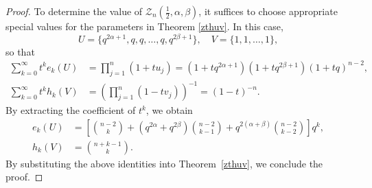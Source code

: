 \documentclass[12pt, a4paper]{amsart} %
\numberwithin{equation}{section}
\begin{document}
\begin{proof} 
To determine the value of $\mathcal{Z}_n(\frac12, \alpha, \beta)$,
it suffices to choose appropriate special values for the parameters in Theorem \ref{zthuv}.
In this case,
$$
	U=\{q^{2\alpha+1}, q,q,\ldots, q , q^{2\beta +1} \},
	\quad
	V=\{1,1,\ldots, 1 \},
$$
so that
\begin{align*}
	\sum_{k=0}^{\infty}t^ke_k(U)&=\prod_{j=1}^{n}(1+tu_j)=(1+tq^{2\alpha+1})(1+tq^{2\beta+1})(1+tq)^{n-2},\\
	\sum_{k=0}^{\infty}t^kh_k(V)&=(\prod_{j=1}^{n}(1-tv_j))^{-1}=(1-t)^{-n}.
\end{align*}
By extracting the coefficient of $t^k$, we obtain
\begin{align*}
	e_k(U)&=\left[ \binom{n-2}{k}+(q^{2\alpha} +q^{ 2\beta})\binom{n-2}{k-1}+q^{2(\alpha+\beta)} \binom{n-2}{k-2}  \right] q^k,\\
		h_k(V)&=\binom{n+k-1}{k}.
\end{align*}
By substituting the above identities into Theorem~\ref{zthuv}, we conclude the proof.
\end{proof}
\end{document}
